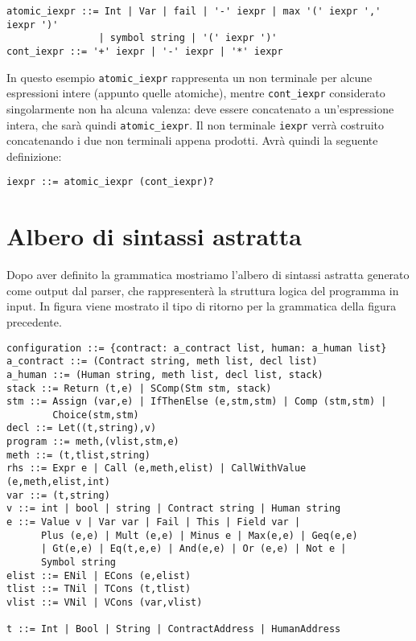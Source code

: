 \documentclass[12pt,a4paper]{report}
\begin{document}
\begin{verbatim}
atomic_iexpr ::= Int | Var | fail | '-' iexpr | max '(' iexpr ',' iexpr ')'
                | symbol string | '(' iexpr ')'
cont_iexpr ::= '+' iexpr | '-' iexpr | '*' iexpr 
\end{verbatim}

In questo esempio \texttt{atomic\_iexpr} rappresenta un non terminale
per alcune espressioni intere (appunto quelle atomiche), mentre
\texttt{cont\_iexpr} considerato singolarmente non ha alcuna valenza:
deve essere concatenato a un'espressione intera, che sarà quindi
\texttt{atomic\_iexpr}. Il non terminale \texttt{iexpr} verrà costruito
concatenando i due non terminali appena prodotti. Avrà quindi la
seguente definizione:

\begin{verbatim}
iexpr ::= atomic_iexpr (cont_iexpr)?
\end{verbatim}

\hypertarget{albero-di-sintassi-astratta}{%
\section{Albero di sintassi
astratta}\label{albero-di-sintassi-astratta}}

Dopo aver definito la grammatica mostriamo l'albero di sintassi astratta
generato come output dal parser, che rappresenterà la struttura logica
del programma in input. In figura viene mostrato il tipo di ritorno per
la grammatica della figura precedente.

\begin{verbatim}
configuration ::= {contract: a_contract list, human: a_human list}
a_contract ::= (Contract string, meth list, decl list)
a_human ::= (Human string, meth list, decl list, stack)
stack ::= Return (t,e) | SComp(Stm stm, stack)
stm ::= Assign (var,e) | IfThenElse (e,stm,stm) | Comp (stm,stm) |
        Choice(stm,stm)
decl ::= Let((t,string),v)
program ::= meth,(vlist,stm,e)
meth ::= (t,tlist,string)
rhs ::= Expr e | Call (e,meth,elist) | CallWithValue (e,meth,elist,int)
var ::= (t,string)
v ::= int | bool | string | Contract string | Human string
e ::= Value v | Var var | Fail | This | Field var |
      Plus (e,e) | Mult (e,e) | Minus e | Max(e,e) | Geq(e,e)
      | Gt(e,e) | Eq(t,e,e) | And(e,e) | Or (e,e) | Not e |
      Symbol string
elist ::= ENil | ECons (e,elist)
tlist ::= TNil | TCons (t,tlist)
vlist ::= VNil | VCons (var,vlist)

t ::= Int | Bool | String | ContractAddress | HumanAddress
\end{verbatim}
\end{document}
